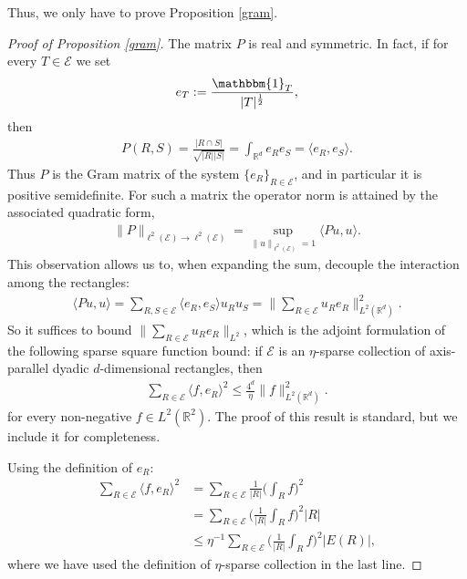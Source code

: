 \documentclass[oneside]{amsart}
\theoremstyle{definition}
\theoremstyle{plain}
\numberwithin{equation}{section}
\numberwithin{theorem}{section}
\newcommand{\ind}{\mathbbm{1}}
\begin{document}
Thus, we only have to prove Proposition \ref{gram}.
\begin{proof}[Proof of Proposition \ref{gram}]
  The matrix $P$ is real and symmetric.
  In fact, if for every $T \in \mathcal{E}$ we set
  \begin{align*}
    e_T := \frac{\ind_T}{|T|^{\frac{1}{2}}},
  \end{align*}
  then
  \begin{align*}
    P(R,S) = \frac{|R \cap S|}{\sqrt{|R||S|}}
    = \int_{\mathbb{R}^d} e_R e_S = \langle e_R, e_S \rangle.
  \end{align*}
  Thus $P$ is the Gram matrix of the system $\{e_R\}_{R \in \mathcal{E}}$,
  and in particular it is positive semidefinite. For such a matrix the
  operator norm is attained by the associated quadratic form,
  \begin{align*}
    \|P\|_{\ell^2(\mathcal{E}) \to \ell^2(\mathcal{E})}
    = \sup_{\|u\|_{\ell^2(\mathcal{E})} = 1} \langle Pu, u \rangle.
  \end{align*}
  This observation allows us to, when expanding the sum, decouple the
  interaction among the rectangles:
  \begin{align*}
    \langle Pu, u \rangle = \sum_{R, S \in \mathcal{E}}
    \langle e_R, e_S \rangle u_R u_S
    = \bigg\| \sum_{R \in \mathcal{E}} u_R e_R
      \bigg\|_{L^2(\mathbb{R}^d)}^2.
  \end{align*}
  So it suffices to bound $\|\sum_{R \in \mathcal{E}} u_R e_R\|_{L^2}$,
  which is the adjoint formulation of the following sparse square function
  bound:
  if $\mathcal{E}$ is an $\eta$-sparse collection of axis-parallel dyadic
  $d$-dimensional rectangles, then
  \begin{align*}
    \sum_{R \in \mathcal{E}} \langle f, e_R \rangle^2 \leq \frac{4^d}{\eta}
    \|f\|_{L^2(\mathbb{R}^d)}^2.
  \end{align*}
  for every non-negative $f \in L^2(\mathbb{R}^2)$.
  The proof of this result is standard, but we include it for completeness.

  Using the definition of $e_R$:
  \begin{align*}
    \sum_{R \in \mathcal{E}} \langle f, e_R \rangle^2 &=
      \sum_{R \in \mathcal{E}} \frac{1}{|R|} \bigg( \int_R f \bigg)^2 \\
      &= \sum_{R \in \mathcal{E}} \bigg( \frac{1}{|R|} \int_R f \bigg)^2 |R| \\
      &\leq \eta^{-1} \sum_{R \in \mathcal{E}} \bigg( \frac{1}{|R|} \int_R f
      \bigg)^2 |E(R)|,
  \end{align*}
  where we have used the definition of $\eta$-sparse collection in the last
  line.


\end{proof}
\end{document}
